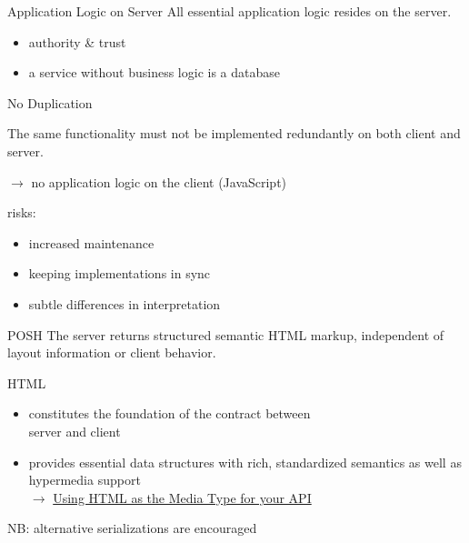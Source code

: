 \documentclass{beamer}
\begin{document}
\begin{frame}{Application Logic on Server}
  All essential application logic resides on the server.

  \begin{itemize}
    \item authority \& trust
    \item a service without business logic is a database
  \end{itemize}

\end{frame}

\begin{frame}{No Duplication}

  The same functionality must not be implemented redundantly on both client and server.

  \vspace*{0.25cm}
  \ensuremath{\rightarrow} no application logic on the client (JavaScript)

  \vspace*{0.5cm}
  risks:
  \begin{itemize}
    \item increased maintenance
    \item keeping implementations in sync
    \item subtle differences in interpretation
  \end{itemize}
\end{frame}

\begin{frame}{POSH}
  The server returns structured semantic HTML markup, independent of layout information or client behavior.

  \vspace*{0.25cm}
  HTML
  \begin{itemize}
    \item constitutes the foundation of the contract between \\ server and client
    \item provides essential data structures with rich, standardized semantics as well as hypermedia support \\
      \ensuremath{\rightarrow}
      \href{http://codeartisan.blogspot.de/2012/07/using-html-as-media-type-for-your-api.html}{Using HTML as the Media Type for your API}
  \end{itemize}

  \vspace*{0.25cm}
  NB: alternative serializations are encouraged
\end{frame}
\end{document}
